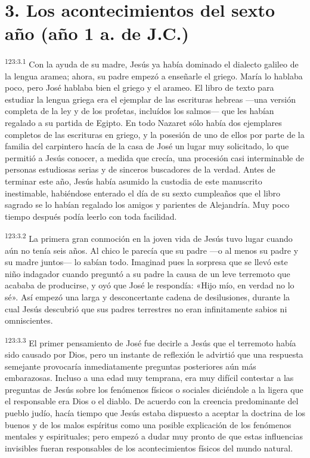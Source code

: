 \section*{3. Los acontecimientos del sexto año (año 1 a. de J.C.)}
\par
\textsuperscript{123:3.1} Con la ayuda de su madre, Jesús ya había dominado el dialecto galileo de la lengua aramea; ahora, su padre empezó a enseñarle el griego. María lo hablaba poco, pero José hablaba bien el griego y el arameo. El libro de texto para estudiar la lengua griega era el ejemplar de las escrituras hebreas ---una versión completa de la ley y de los profetas, incluídos los salmos--- que les habían regalado a su partida de Egipto. En todo Nazaret sólo había dos ejemplares completos de las escrituras en griego, y la posesión de uno de ellos por parte de la familia del carpintero hacía de la casa de José un lugar muy solicitado, lo que permitió a Jesús conocer, a medida que crecía, una procesión casi interminable de personas estudiosas serias y de sinceros buscadores de la verdad. Antes de terminar este año, Jesús había asumido la custodia de este manuscrito inestimable, habiéndose enterado el día de su sexto cumpleaños que el libro sagrado se lo habían regalado los amigos y parientes de Alejandría. Muy poco tiempo después podía leerlo con toda facilidad.

\par
\textsuperscript{123:3.2} La primera gran conmoción en la joven vida de Jesús tuvo lugar cuando aún no tenía seis años. Al chico le parecía que su padre ---o al menos su padre y su madre juntos--- lo sabían todo. Imaginad pues la sorpresa que se llevó este niño indagador cuando preguntó a su padre la causa de un leve terremoto que acababa de producirse, y oyó que José le respondía: «Hijo mío, en verdad no lo sé». Así empezó una larga y desconcertante cadena de desilusiones, durante la cual Jesús descubrió que sus padres terrestres no eran infinitamente sabios ni omniscientes.

\par
\textsuperscript{123:3.3} El primer pensamiento de José fue decirle a Jesús que el terremoto había sido causado por Dios, pero un instante de reflexión le advirtió que una respuesta semejante provocaría inmediatamente preguntas posteriores aún más embarazosas. Incluso a una edad muy temprana, era muy difícil contestar a las preguntas de Jesús sobre los fenómenos físicos o sociales diciéndole a la ligera que el responsable era Dios o el diablo. De acuerdo con la creencia predominante del pueblo judío, hacía tiempo que Jesús estaba dispuesto a aceptar la doctrina de los buenos y de los malos espíritus como una posible explicación de los fenómenos mentales y espirituales; pero empezó a dudar muy pronto de que estas influencias invisibles fueran responsables de los acontecimientos físicos del mundo natural.

